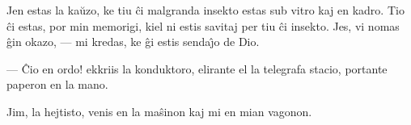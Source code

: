    Jen estas la ka\u uzo, ke tiu \^ci malgranda insekto estas sub vitro kaj
en kadro. Tio \^ci estas, por min memorigi, kiel ni estis savitaj
per tiu \^ci insekto. Jes, vi nomas \^gin okazo, --- mi kredas, ke
\^gi estis senda\^{\j}o de Dio.

 --- \^Cio en ordo! ekkriis la konduktoro, elirante el la telegrafa
stacio, portante paperon en la mano.

   Jim, la hejtisto, venis en la ma\^sinon kaj mi en mian vagonon.

\smallrule{}
